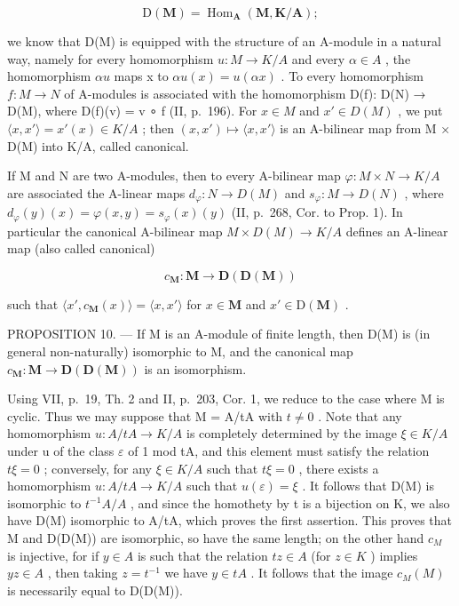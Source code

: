 \[
\mathrm{D} (\mathbf {M}) = \operatorname{Hom} _ {\mathbf {A}} (\mathbf {M}, \mathbf {K} / \mathbf {A});
\]

we know that D(M) is equipped with the structure of an A-module in a natural way, namely for every homomorphism \(u: M \to K/A\) and every \(\alpha \in A\) , the homomorphism \(\alpha u\) maps x to \(\alpha u(x) = u(\alpha x)\) . To every homomorphism \(f: M \to N\) of A-modules is associated with the homomorphism D(f): D(N) → D(M), where D(f)(v) = v ∘ f (II, p.~196). For \(x \in M\) and \(x' \in D(M)\) , we put \(\langle x, x' \rangle = x'(x) \in K/A\) ; then \((x, x') \mapsto \langle x, x' \rangle\) is an A-bilinear map from M × D(M) into K/A, called canonical.

If M and N are two A-modules, then to every A-bilinear map \(\varphi: M \times N \to K/A\) are associated the A-linear maps \(d_{\varphi}: N \to D(M)\) and \(s_{\varphi}: M \to D(N)\) , where \(d_{\varphi}(y)(x) = \varphi(x, y) = s_{\varphi}(x)(y)\) (II, p.~268, Cor. to Prop. 1). In particular the canonical A-bilinear map \(M \times D(M) \to K/A\) defines an A-linear map (also called canonical)

\[
c _ {\mathbf {M}}: \mathbf {M} \rightarrow \mathbf {D} (\mathbf {D} (\mathbf {M}))
\]

such that \(\langle x', c_{\mathbf{M}}(x) \rangle = \langle x, x' \rangle\) for \(x \in \mathbf{M}\) and \(x' \in \mathrm{D}(\mathbf{M})\) .

PROPOSITION 10. --- If M is an A-module of finite length, then D(M) is (in general non-naturally) isomorphic to M, and the canonical map \(c_{\mathbf{M}}: \mathbf{M} \to \mathbf{D}(\mathbf{D}(\mathbf{M}))\) is an isomorphism.

Using VII, p.~19, Th. 2 and II, p.~203, Cor. 1, we reduce to the case where M is cyclic. Thus we may suppose that M = A/tA with \(t \neq 0\) . Note that any homomorphism \(u: A/tA \to K/A\) is completely determined by the image \(\xi \in K/A\) under u of the class \(\varepsilon\) of 1 mod tA, and this element must satisfy the relation \(t\xi = 0\) ; conversely, for any \(\xi \in K/A\) such that \(t\xi = 0\) , there exists a homomorphism \(u: A/tA \to K/A\) such that \(u(\varepsilon) = \xi\) . It follows that D(M) is isomorphic to \(t^{-1}A/A\) , and since the homothety by t is a bijection on K, we also have D(M) isomorphic to A/tA, which proves the first assertion. This proves that M and D(D(M)) are isomorphic, so have the same length; on the other hand \(c_{M}\) is injective, for if \(y \in A\) is such that the relation \(tz \in A\) (for \(z \in K\) ) implies \(yz \in A\) , then taking \(z = t^{-1}\) we have \(y \in tA\) . It follows that the image \(c_{M}(M)\) is necessarily equal to D(D(M)).

